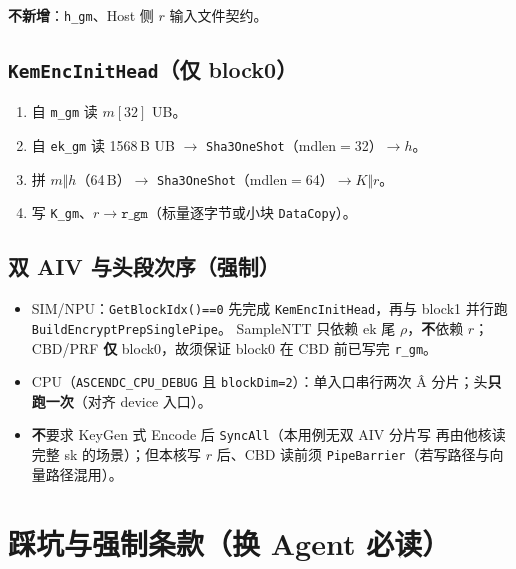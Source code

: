\documentclass[UTF8,a4paper,11pt]{ctexart}
\begin{document}
\textbf{不新增}：\texttt{h\_gm}、Host 侧 $r$ 输入文件契约。

\subsection{\texttt{KemEncInitHead}（仅 block0）}

\begin{enumerate}
  \item 自 \texttt{m\_gm} 读 $m[32]$ UB。
  \item 自 \texttt{ek\_gm} 读 1568\,B UB $\to$ \texttt{Sha3OneShot}（mdlen$=$32）$\to h$。
  \item 拼 $m\Vert h$（64\,B）$\to$ \texttt{Sha3OneShot}（mdlen$=$64）$\to K\Vert r$。
  \item 写 \texttt{K\_gm}、$r\to\texttt{r\_gm}$（标量逐字节或小块 \texttt{DataCopy}）。
\end{enumerate}

\subsection{双 AIV 与头段次序（强制）}

\begin{itemize}
  \item SIM/NPU：\texttt{GetBlockIdx()==0} 先完成 \texttt{KemEncInitHead}，再与
        block1 并行跑 \texttt{BuildEncryptPrepSinglePipe}。
        SampleNTT 只依赖 $\mathrm{ek}$ 尾 $\rho$，\textbf{不}依赖 $r$；
        CBD/PRF \textbf{仅} block0，故须保证 block0 在 CBD 前已写完 \texttt{r\_gm}。
  \item CPU（\texttt{ASCENDC\_CPU\_DEBUG} 且 \texttt{blockDim=2}）：单入口串行两次
        Â 分片；头\textbf{只跑一次}（对齐 device 入口）。
  \item \textbf{不}要求 KeyGen 式 Encode 后 \texttt{SyncAll}（本用例无双 AIV 分片写
        再由他核读完整 sk 的场景）；但本核写 $r$ 后、CBD 读前须
        \texttt{PipeBarrier}（若写路径与向量路径混用）。
\end{itemize}

\section{踩坑与强制条款（换 Agent 必读）}
\label{sec:landmines}
\end{document}
